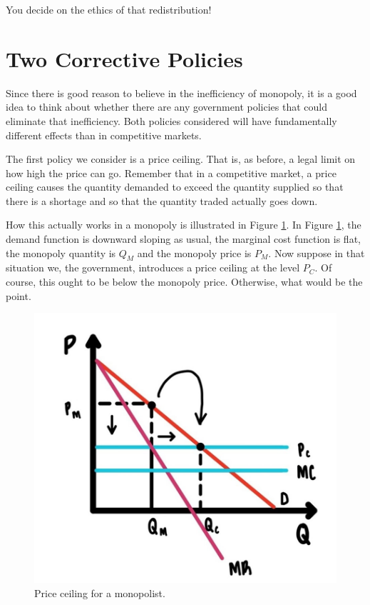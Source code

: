 \documentclass[
]{book}
\begin{document}
You decide on the ethics of that redistribution!

\hypertarget{two-corrective-policies}{%
\section{Two Corrective Policies}\label{two-corrective-policies}}

Since there is good reason to believe in the inefficiency of monopoly, it is a good idea to think about whether there are any government policies that could eliminate that inefficiency. Both policies considered will have fundamentally different effects than in competitive markets.

The first policy we consider is a price ceiling. That is, as before, a legal limit on how high the price can go. Remember that in a competitive market, a price ceiling causes the quantity demanded to exceed the quantity supplied so that there is a shortage and so that the quantity traded actually goes down.

How this actually works in a monopoly is illustrated in Figure \ref{fig:monopoly05}. In Figure \ref{fig:monopoly05}, the demand function is downward sloping as usual, the marginal cost function is flat, the monopoly quantity is \(Q_M\) and the monopoly price is \(P_M\). Now suppose in that situation we, the government, introduces a price ceiling at the level \(P_C\). Of course, this ought to be below the monopoly price. Otherwise, what would be the point.

\begin{figure}

{\centering \includegraphics[width=0.75\linewidth]{img/monopoly/fig5} 

}

\caption{Price ceiling for a monopolist.}\label{fig:monopoly05}
\end{figure}
\end{document}
